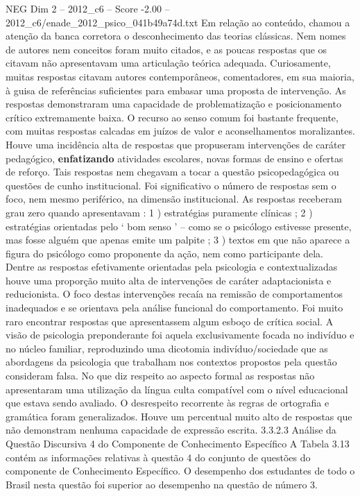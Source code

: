 \begin{textsample}{NEG Dim 2 – 2012\_c6 – Score -2.00 – 2012\_c6/enade\_2012\_psico\_041b49a74d.txt}
Em relação ao conteúdo, chamou a atenção da banca corretora o desconhecimento das teorias clássicas.
Nem nomes de autores nem conceitos foram muito citados, e as poucas respostas que os citavam não apresentavam uma articulação teórica adequada.
Curiosamente, muitas respostas citavam autores contemporâneos, comentadores, em sua maioria, à guisa de referências suficientes para embasar uma proposta de intervenção.
As respostas demonstraram uma capacidade de problematização e posicionamento crítico extremamente baixa.
O recurso ao senso comum foi bastante frequente, com muitas respostas calcadas em juízos de valor e aconselhamentos moralizantes.
Houve uma incidência alta de respostas que propuseram intervenções de caráter pedagógico, \textbf{enfatizando} atividades escolares, novas formas de ensino e ofertas de reforço.
Tais respostas nem chegavam a tocar a questão psicopedagógica ou questões de cunho institucional.
Foi significativo o número de respostas sem o foco, nem mesmo periférico, na dimensão institucional.
As respostas receberam grau zero quando apresentavam : 1 ) estratégias puramente clínicas ; 2 ) estratégias orientadas pelo ‘ bom senso ’ – como se o psicólogo estivesse presente, mas fosse alguém que apenas emite um palpite ; 3 ) textos em que não aparece a figura do psicólogo como proponente da ação, nem como participante dela.
Dentre as respostas efetivamente orientadas pela psicologia e contextualizadas houve uma proporção muito alta de intervenções de caráter adaptacionista e reducionista.
O foco destas intervenções recaía na remissão de comportamentos inadequados e se orientava pela análise funcional do comportamento.
Foi muito raro encontrar respostas que apresentassem algum esboço de crítica social.
A visão de psicologia preponderante foi aquela exclusivamente focada no indivíduo e no núcleo familiar, reproduzindo uma dicotomia indivíduo/sociedade que as abordagens da psicologia que trabalham nos contextos propostos pela questão consideram falsa.
No que diz respeito ao aspecto formal as respostas não apresentaram uma utilização da língua culta compatível com o nível educacional que estava sendo avaliado.
O desrespeito recorrente às regras de ortografia e gramática foram generalizados.
Houve um percentual muito alto de respostas que não demonstram nenhuma capacidade de expressão escrita. 3.3.2.3 Análise da Questão Discursiva 4 do Componente de Conhecimento Específico A Tabela 3.13 contém as informações relativas à questão 4 do conjunto de questões do componente de Conhecimento Específico.
O desempenho dos estudantes de todo o Brasil nesta questão foi superior ao desempenho na questão de número 3.

\end{textsample}
